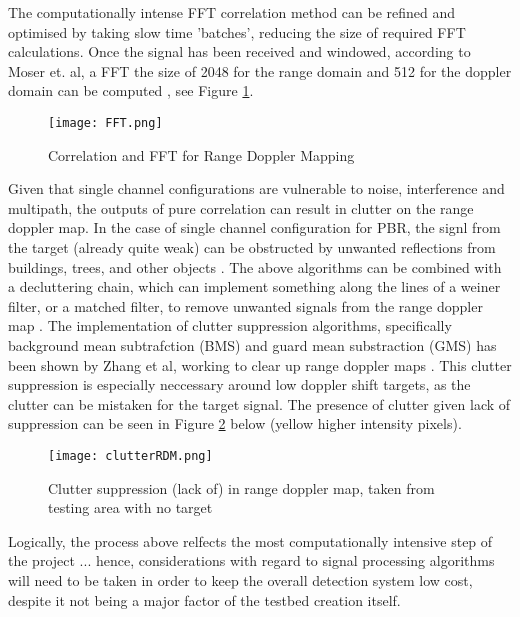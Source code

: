 

\par \vspace{0.5cm} 
\noindent The computationally intense FFT correlation method can be refined and optimised by taking slow time 'batches', reducing the size of required FFT calculations. Once the signal has been received and windowed, according to Moser et. al, a FFT the size of 2048 for the range domain and 512 for the doppler domain can be computed \cite{IOTpassiveRadar}, see Figure \ref{fig:FFT}. 

\begin{figure}[htbp]
    \centering
    \texttt{[image: FFT.png]}
    \caption{Correlation and FFT for Range Doppler Mapping \cite{IOTpassiveRadar}}
    \label{fig:FFT}
\end{figure}

Given that single channel configurations are vulnerable to noise, interference and multipath, the outputs of pure correlation can result in clutter on the range doppler map. In the case of single channel configuration for PBR, the signl from the target (already quite weak) can be obstructed by unwanted reflections from buildings, trees, and other objects \cite{INTRO2017}. The above algorithms can be combined with a decluttering chain, which can implement something along the lines of a weiner filter, or a matched filter, to remove unwanted signals from the range doppler map \cite{FundamentalsPassiveRadar}. The implementation of clutter suppression algorithms, specifically background mean subtrafction (BMS) and guard mean substraction (GMS) has been shown by Zhang et al, working to clear up range doppler maps \cite{ZhangClutter}. This clutter suppression is especially neccessary around low doppler shift targets, as the clutter can be mistaken for the target signal. The presence of clutter given lack of suppression can be seen in Figure \ref{fig:clutter} below (yellow higher intensity pixels).

\begin{figure}[htbp]
    \centering
    \texttt{[image: clutterRDM.png]}
    \caption{Clutter suppression (lack of) in range doppler map, taken from testing area with no target}
    \label{fig:clutter}
\end{figure}


\noindent Logically, the process above relfects the most computationally intensive step of the project ... hence, considerations with regard to signal processing algorithms will need to be taken in order to keep the overall detection system low cost, despite it not being a major factor of the testbed creation itself. 


